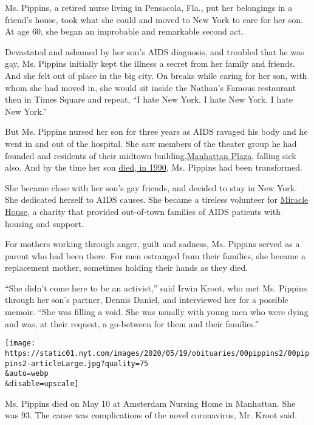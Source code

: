 Ms. Pippins, a retired nurse living in Pensacola, Fla., put her
belongings in a friend's house, took what she could and moved to New
York to care for her son. At age 60, she began an improbable and
remarkable second act.

Devastated and ashamed by her son's AIDS diagnosis, and troubled that he
was gay, Ms. Pippins initially kept the illness a secret from her family
and friends. And she felt out of place in the big city. On breaks while
caring for her son, with whom she had moved in, she would sit inside the
Nathan's Famous restaurant then in Times Square and repeat, ``I hate New
York. I hate New York. I hate New York.''

But Ms. Pippins nursed her son for three years as AIDS ravaged his body
and he went in and out of the hospital. She saw members of the theater
group he had founded and residents of their midtown
building,\href{https://www.nytimes.com/1989/09/08/nyregion/on-the-block-where-aids-hits-hardest-residents-rally.html}{Manhattan
Plaza}, falling sick also. And by the time her son
\href{https://www.nytimes.com/1990/07/29/obituaries/nick-pippin-35-dies-founded-aids-group.html}{died,
in 1990}, Ms. Pippins had been transformed.

She became close with her son's gay friends, and decided to stay in New
York. She dedicated herself to AIDS causes. She became a tireless
volunteer for
\href{https://www.edgemedianetwork.com/news/local/162240}{Miracle
House}, a charity that provided out-of-town families of AIDS patients
with housing and support.

For mothers working through anger, guilt and sadness, Ms. Pippins served
as a parent who had been there. For men estranged from their families,
she became a replacement mother, sometimes holding their hands as they
died.

``She didn't come here to be an activist,'' said Irwin Kroot, who met
Ms. Pippins through her son's partner, Dennis Daniel, and interviewed
her for a possible memoir. ``She was filling a void. She was usually
with young men who were dying and was, at their request, a go-between
for them and their families.''

\texttt{[image: https://static01.nyt.com/images/2020/05/19/obituaries/00pippins2/00pippins2-articleLarge.jpg?quality=75\\\&auto=webp\\\&disable=upscale]}

Ms. Pippins died on May 10 at Amsterdam Nursing Home in Manhattan. She
was 93. The cause was complications of the novel coronavirus, Mr. Kroot
said.

